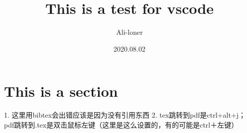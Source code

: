 \documentclass[a4paper]{article}
\title{\heiti\zihao{2} This is a test for vscode}
\author{\songti Ali-loner}
\date{2020.08.02}
\begin{document}
    \maketitle
\begin{abstract}
    \lipsum[2]
\end{abstract}
\tableofcontents
\section{This is a section}
1. 这里用bibtex会出错应该是因为没有引用东西
2. tex跳转到pdf是ctrl+alt+j；pdf跳转到.tex是双击鼠标左键（这里是这么设置的，有的可能是ctrl＋左键）
\end{document}
